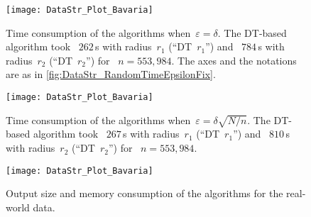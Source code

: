 \begin{figure}[h]	
\centering
\texttt{[image: DataStr\_Plot\_Bavaria]}
\vspace{-3mm}
\caption{Time consumption of the algorithms 
	when~$\varepsilon=\delta$. 
	The DT-based algorithm took~  
	$262\,$s with radius~$r_1$ (``DT~$r_1$'') and~  
	$784\,$s with radius~$r_2$ (``DT~$r_2$'') for~
    $n=553{,}984$. 
	The axes and the notations are as in 
	\fig\ref{fig:DataStr_RandomTimeEpsilonFix}.}
\label{fig:DataStr_BavariaTimeEpsilonFix}
%	
\vspace{8mm}
%
\centering
\texttt{[image: DataStr\_Plot\_Bavaria]}
\vspace{-3mm}
\caption{Time consumption of the algorithms 
	when~$\varepsilon=\delta\sqrt{N/n}$. 
	The DT-based algorithm took~ 
	$267\,$s with radius~$r_1$ (``DT~$r_1$'') and~  
	$810\,$s with radius~$r_2$ (``DT~$r_2$'') for~ 
	$n=553{,}984$.}
\label{fig:DataStr_BavariaTimeEpsilonDecrease}
\end{figure}

\begin{figure}[tb]	
\centering
\texttt{[image: DataStr\_Plot\_Bavaria]}
\vspace{-6mm}
\caption{Output size and memory consumption 
	of the algorithms for the real-world data.}
\label{fig:DataStr_BavariaMemory}
\end{figure}